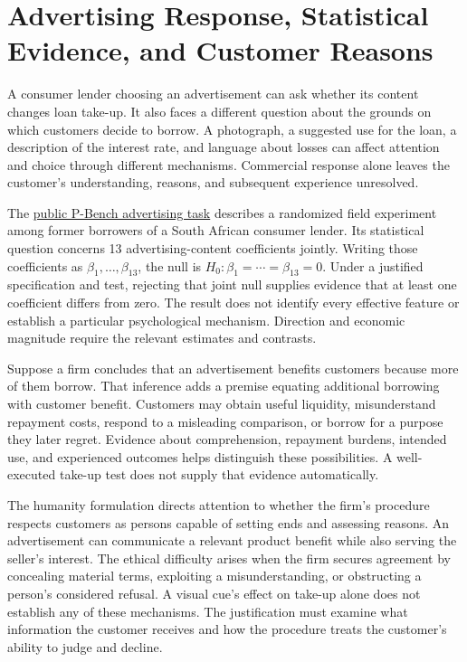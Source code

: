 
\hypertarget{M09-advertising-response-statistical-evidence-and-customer-reasons}{%
\section{Advertising Response, Statistical Evidence, and Customer
Reasons}\label{M09-advertising-response-statistical-evidence-and-customer-reasons}}

\noindent \noindent A consumer lender choosing an advertisement can ask whether
its content changes loan take-up. It also faces a different question
about the grounds on which customers decide to borrow. A photograph, a
suggested use for the loan, a description of the interest rate, and
language about losses can affect attention and choice through different
mechanisms. Commercial response alone leaves the customer's
understanding, reasons, and subsequent experience unresolved.

The
\href{https://huggingface.co/datasets/May2222/P-Bench/blob/main/tasks/chi_square_test/dfeep__paper_90__task_4/question.txt}{public
P-Bench advertising task} describes a randomized field experiment among
former borrowers of a South African consumer lender. Its statistical
question concerns 13 advertising-content coefficients jointly. Writing
those coefficients as \(\beta_1,\ldots,\beta_{13}\), the null is
\(H_0:\beta_1=\cdots=\beta_{13}=0\). Under a justified specification and
test, rejecting that joint null supplies evidence that at least one
coefficient differs from zero. The result does not identify every
effective feature or establish a particular psychological mechanism.
Direction and economic magnitude require the relevant estimates and
contrasts.

Suppose a firm concludes that an advertisement benefits customers
because more of them borrow. That inference adds a premise equating
additional borrowing with customer benefit. Customers may obtain useful
liquidity, misunderstand repayment costs, respond to a misleading
comparison, or borrow for a purpose they later regret. Evidence about
comprehension, repayment burdens, intended use, and experienced outcomes
helps distinguish these possibilities. A well-executed take-up test does
not supply that evidence automatically.

The humanity formulation directs attention to whether the firm's
procedure respects customers as persons capable of setting ends and
assessing reasons. An advertisement can communicate a relevant product
benefit while also serving the seller's interest. The ethical difficulty
arises when the firm secures agreement by concealing material terms,
exploiting a misunderstanding, or obstructing a person's considered
refusal. A visual cue's effect on take-up alone does not establish any
of these mechanisms. The justification must examine what information the
customer receives and how the procedure treats the customer's ability to
judge and decline.

